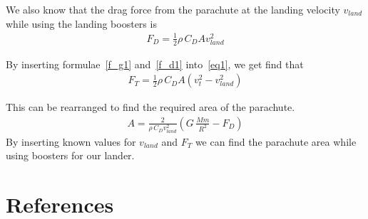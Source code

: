 \documentclass[reprint,english,notitlepage]{revtex4-2}
\begin{document}
We also know that the drag force from the parachute at the landing velocity $v_{land}$ while using the landing boosters is
\begin{align}
    F_D = \frac{1}{2}\rho \,C_D A v_{land}^2 \label{f_d1}
\end{align}

By inserting formulae~\ref{f_g1} and~\ref{f_d1} into~\ref{eq1}, we get find that
\begin{align}
    F_T = \frac{1}{2}\rho \,C_D A \left(v_t^2 - v_{land}^2 \right)
\end{align}

This can be rearranged to find the required area of the parachute.
\begin{align}
    A = \frac{2}{\rho \,C_D v_{land}^2}\left( G\,\frac{M m}{R^2} - F_D \right)
\end{align}
By inserting known values for $v_{land}$ and $F_T$ we can find the parachute area while using boosters for our lander.

\section*{References} \label{sec:references}
\end{document}
